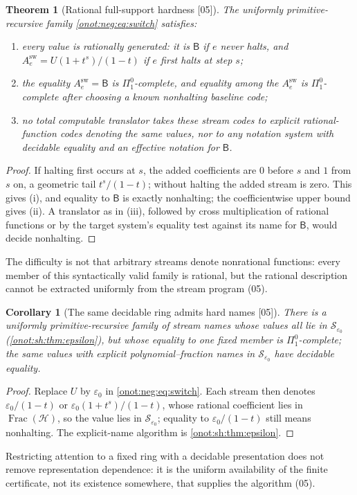 \documentclass[11pt,oneside]{article}
\numberwithin{equation}{section}
\newtheorem{theorem}{Theorem}[section]
\newtheorem{corollary}[corollary]{Corollary}
\theoremstyle{definition}
\theoremstyle{remark}
\newcommand{\FH}{\operatorname{Frac}(\mathcal H)}
\newcommand{\SE}{\mathcal S_{\varepsilon_0}}
\newcommand{\sB}{\mathsf B}
\newcommand{\src}[1]{\textup{\textsf{\small[#1]}}}
\begin{document}
\begin{theorem}[Rational full-support hardness \src{05}]\label{onot:neg:thm:rationalhard}
The uniformly primitive-recursive family \eqref{onot:neg:eq:switch} satisfies:
\begin{enumerate}[label=\textup{(\roman*)}]
\item every value is rationally generated: it is $\sB$ if $e$ never halts, and
$A^{\mathrm{sw}}_e=U(1+t^s)/(1-t)$ if $e$ first halts at step $s$;
\item the equality $A^{\mathrm{sw}}_e=\sB$ is $\Pi^0_1$-complete, and equality among
the $A^{\mathrm{sw}}_e$ is $\Pi^0_1$-complete after choosing a known nonhalting
baseline code;
\item no total computable translator takes these stream codes to explicit
rational-function codes denoting the same values, nor to any notation system with
decidable equality and an effective notation for $\sB$.
\end{enumerate}
\end{theorem}
\begin{proof}
If halting first occurs at $s$, the added coefficients are $0$ before $s$ and $1$
from $s$ on, a geometric tail $t^s/(1-t)$; without halting the added stream is
zero. This gives (i), and equality to $\sB$ is exactly nonhalting; the
coefficientwise upper bound gives (ii). A translator as in (iii), followed by
cross multiplication of rational functions or by the target system's equality test
against its name for $\sB$, would decide nonhalting.
\end{proof}

The difficulty is not that arbitrary streams denote nonrational functions: every
member of this syntactically valid family is rational, but the rational
description cannot be extracted uniformly from the stream program (05).

\begin{corollary}[The same decidable ring admits hard names \src{05}]\label{onot:neg:cor:samering}
There is a uniformly primitive-recursive family of stream names whose values all
lie in $\SE$ (\cref{onot:sh:thm:epsilon}), but whose equality to one fixed member is
$\Pi^0_1$-complete; the same values with explicit polynomial--fraction names in
$\SE$ have decidable equality.
\end{corollary}
\begin{proof}
Replace $U$ by $\varepsilon_0$ in \eqref{onot:neg:eq:switch}. Each stream then
denotes $\varepsilon_0/(1-t)$ or $\varepsilon_0(1+t^s)/(1-t)$, whose rational
coefficient lies in $\FH$, so the value lies in $\SE$; equality to
$\varepsilon_0/(1-t)$ still means nonhalting. The explicit-name algorithm is
\cref{onot:sh:thm:epsilon}.
\end{proof}
Restricting attention to a fixed ring with a decidable presentation does not remove
representation dependence: it is the uniform availability of the finite
certificate, not its existence somewhere, that supplies the algorithm (05).
\end{document}
